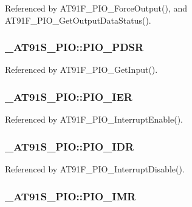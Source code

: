Referenced by AT91F\_\-PIO\_\-ForceOutput(), and AT91F\_\-PIO\_\-GetOutputDataStatus().\hypertarget{struct__AT91S__PIO_488891d3a2370ac9f45a4ff17284d9fc}{
\subsubsection{ {\bf \_\-AT91S\_\-PIO::PIO\_\-PDSR}}}
\label{struct__AT91S__PIO_488891d3a2370ac9f45a4ff17284d9fc}




Referenced by AT91F\_\-PIO\_\-GetInput().\hypertarget{struct__AT91S__PIO_eacd9bc65de675dbc7d3984474d46301}{
\subsubsection{ {\bf \_\-AT91S\_\-PIO::PIO\_\-IER}}}
\label{struct__AT91S__PIO_eacd9bc65de675dbc7d3984474d46301}




Referenced by AT91F\_\-PIO\_\-InterruptEnable().\hypertarget{struct__AT91S__PIO_6febd34d27031597d839f39419bc7b24}{
\subsubsection{ {\bf \_\-AT91S\_\-PIO::PIO\_\-IDR}}}
\label{struct__AT91S__PIO_6febd34d27031597d839f39419bc7b24}




Referenced by AT91F\_\-PIO\_\-InterruptDisable().\hypertarget{struct__AT91S__PIO_a3a9b49a233df3fc828073e041f36049}{
\subsubsection{ {\bf \_\-AT91S\_\-PIO::PIO\_\-IMR}}}
\label{struct__AT91S__PIO_a3a9b49a233df3fc828073e041f36049}




